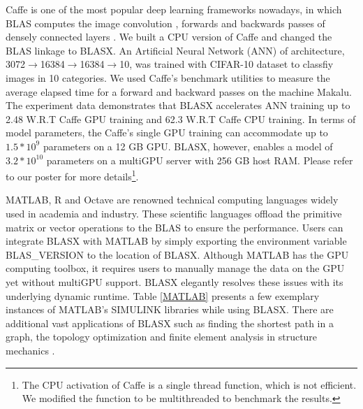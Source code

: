 \documentclass[conference]{IEEEtran}
\begin{document}
\begin{inparaenum} 

\item Caffe \cite{caffe} is one of the most popular deep learning frameworks nowadays, in which 
BLAS computes the image convolution \cite{img_conv}, forwards and backwards passes of densely connected
layers \cite{ANN}. We built a CPU version of Caffe and changed the BLAS linkage to BLASX.
An Artificial Neural Network (ANN) of architecture, 3072$\rightarrow$16384$\rightarrow$16384$\rightarrow$10, 
was trained with CIFAR-10 dataset \cite{cifar10} to classfiy images in 10 categories. We used
Caffe's benchmark utilities to measure the average elapsed time for a forward and backward passes
on the machine Makalu. The experiment data demonstrates that BLASX accelerates ANN 
training up to 2.48 W.R.T Caffe GPU training and 62.3 W.R.T Caffe CPU training. In terms
of model parameters, the Caffe's single GPU training can accommodate up to $1.5*10^{9}$ parameters
on a 12 GB GPU. BLASX, however, enables a model of $3.2*10^{10}$ parameters on a multiGPU server
with 256 GB host RAM. Please refer to our poster \cite{ANN_BLASX} for more details\footnote{The CPU
activation of Caffe is a single thread function, which is not efficient. We modified the function to be 
multithreaded to benchmark the results.}.

\item MATLAB, R and Octave are renowned technical computing languages widely used in academia
and industry. These scientific languages offload the primitive matrix or vector operations to the BLAS to
ensure the performance. Users can integrate BLASX with MATLAB by simply exporting the 
environment variable BLAS\_VERSION to the location of BLASX.
Although MATLAB has the GPU computing toolbox, it requires users to manually manage the data on the GPU
yet without multiGPU support. BLASX elegantly resolves these issues with 
its underlying dynamic runtime. Table \ref{MATLAB} presents a few exemplary instances of MATLAB's 
SIMULINK libraries while using BLASX. There are additional vast applications of BLASX such as finding the shortest path in a graph, 
the topology optimization\cite{topology_optimization} and finite element analysis in structure mechanics \cite{FEM}.


\end{inparaenum}
\end{document}
